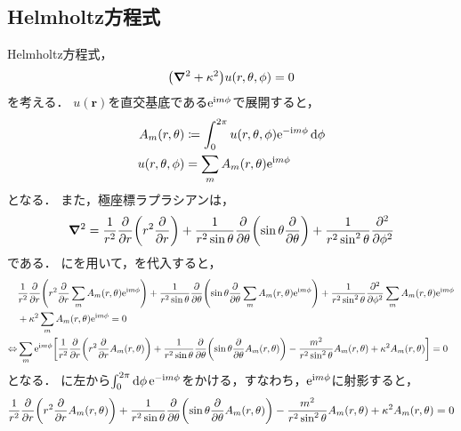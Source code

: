 \documentclass{report}
\begin{document}
  \subsection{Helmholtz方程式}
    Helmholtz方程式，
    \begin{align}
      \qty(\grad^2 + \kappa^2)u(r, \theta, \phi) = 0\label{helmholtz-eq-wave}
    \end{align}
    を考える．
    $u(\bm{r})$を直交基底である$\mathrm{e}^{\mathrm{i} m\phi}$で展開すると，
    \begin{align}
      A_m(r, \theta) &\coloneqq \int_{0}^{2\pi}u(r, \theta, \phi)\mathrm{e}^{-\mathrm{i} m\phi}\dd{\phi} \\ 
      u(r, \theta, \phi) &= \sum_{m}A_m(r, \theta)\mathrm{e}^{\mathrm{i} m\phi}\label{u-expand-with-a} \\ 
    \end{align}
    となる．
    また，極座標ラプラシアンは，
    \begin{align}
      \grad^2 = \frac{1}{r^2}\pdv{r}\qty(r^2\pdv{r}) + \frac{1}{r^2\sin\theta}\pdv{\theta}\qty(\sin\theta\pdv{\theta}) + \frac{1}{r^2\sin^2\theta}\pdv[2]{\phi} \label{polar-laplacian}
    \end{align}
    である．
    にを用いて，を代入すると，
    \begin{align}
      &\frac{1}{r^2}\pdv{r}\qty(r^2\pdv{r}\sum_{m}A_m(r, \theta)\mathrm{e}^{\mathrm{i} m\phi}) + \frac{1}{r^2\sin\theta}\pdv{\theta}\qty(\sin\theta\pdv{\theta}\sum_{m}A_m(r, \theta)\mathrm{e}^{\mathrm{i} m\phi}) + \frac{1}{r^2\sin^2\theta}\pdv[2]{\phi}\sum_{m}A_m(r, \theta)\mathrm{e}^{\mathrm{i} m\phi} \notag \\ 
      &+ \kappa^2\sum_{m}A_m(r, \theta)\mathrm{e}^{\mathrm{i} m\phi} = 0 \\ 
      \Leftrightarrow &\sum_{m}\mathrm{e}^{\mathrm{i} m\phi}\qty[
        \frac{1}{r^2}\pdv{r}\qty(r^2\pdv{r}A_m(r, \theta)) + 
        \frac{1}{r^2\sin\theta}\pdv{\theta}\qty(\sin\theta\pdv{\theta}A_m(r, \theta)) 
        - \frac{m^2}{r^2\sin^2\theta}A_m(r, \theta) + \kappa^2A_m(r, \theta)
      ] = 0 \label{am-before-int}
    \end{align}
    となる．
    に左から$\int_{0}^{2\pi}\dd{\phi}\mathrm{e}^{-\mathrm{i} m\phi}$をかける，すなわち，$\mathrm{e}^{\mathrm{i} m\phi}$に射影すると，
    \begin{align}
      \frac{1}{r^2}\pdv{r}\qty(r^2\pdv{r}A_m(r, \theta)) + \frac{1}{r^2\sin\theta}\pdv{\theta}\qty(\sin\theta\pdv{\theta}A_m(r, \theta)) - \frac{m^2}{r^2\sin^2\theta}A_m(r, \theta) + \kappa^2A_m(r, \theta) = 0 \label{a-condition}
    \end{align}
\end{document}
